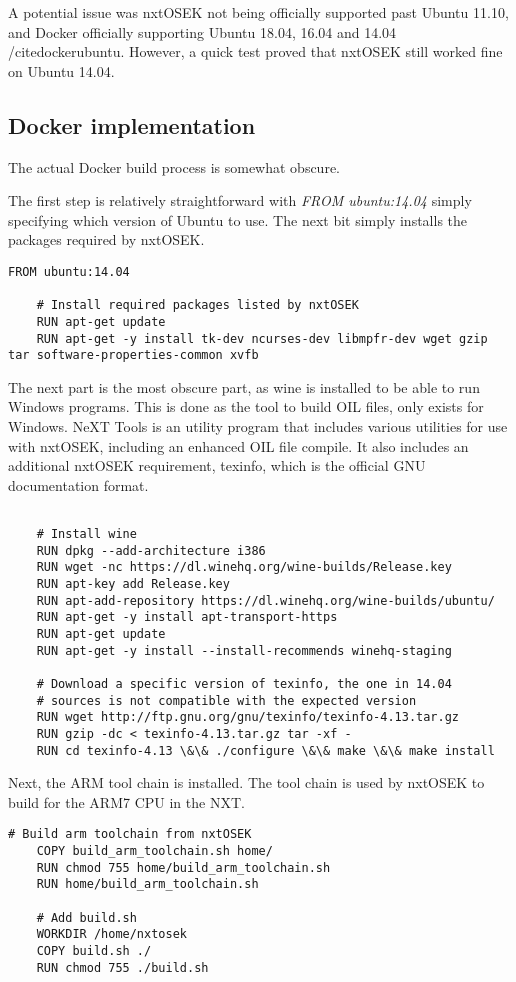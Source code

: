 A potential issue was nxtOSEK not being officially supported past Ubuntu 11.10, and Docker officially supporting Ubuntu 18.04, 16.04 and 14.04 /cite{dockerubuntu}.
However, a quick test proved that nxtOSEK still worked fine on Ubuntu 14.04.

\subsection{Docker implementation}\label{subsec:dockerimplementation}
The actual Docker build process is somewhat obscure.

The first step is relatively straightforward with \textit{FROM ubuntu:14.04} simply specifying which version of Ubuntu to use.
The next bit simply installs the packages required by nxtOSEK.
\begin{lstlisting}[language=docker,label={lst:dockerimplementation1},caption={Version definition and installation of packages required by nxtOSEK}]
    FROM ubuntu:14.04

    # Install required packages listed by nxtOSEK
    RUN apt-get update
    RUN apt-get -y install tk-dev ncurses-dev libmpfr-dev wget gzip tar software-properties-common xvfb
\end{lstlisting} 

The next part is the most obscure part, as wine is installed to be able to run Windows programs.
This is done as the tool to build OIL files, only exists for Windows.
NeXT Tools is an utility program that includes various utilities for use with nxtOSEK, including an enhanced OIL file compile\cite{nxttool}.
It also includes an additional nxtOSEK requirement, texinfo, which is the official GNU documentation format\cite{texinfo}.

\begin{lstlisting}[language=docker,label={lst:dockerimplementation2},caption={Reee}]

    # Install wine
    RUN dpkg --add-architecture i386
    RUN wget -nc https://dl.winehq.org/wine-builds/Release.key
    RUN apt-key add Release.key
    RUN apt-add-repository https://dl.winehq.org/wine-builds/ubuntu/
    RUN apt-get -y install apt-transport-https
    RUN apt-get update
    RUN apt-get -y install --install-recommends winehq-staging
    
    # Download a specific version of texinfo, the one in 14.04 
    # sources is not compatible with the expected version
    RUN wget http://ftp.gnu.org/gnu/texinfo/texinfo-4.13.tar.gz
    RUN gzip -dc < texinfo-4.13.tar.gz tar -xf -
    RUN cd texinfo-4.13 \&\& ./configure \&\& make \&\& make install
\end{lstlisting} 
Next, the ARM tool chain is installed.
The tool chain is used by nxtOSEK to build for the ARM7 CPU in the NXT.
\begin{lstlisting}[language=docker,label={lst:dockerimplementation3},caption={Reee}]
    # Build arm toolchain from nxtOSEK
    COPY build_arm_toolchain.sh home/
    RUN chmod 755 home/build_arm_toolchain.sh
    RUN home/build_arm_toolchain.sh
    
    # Add build.sh
    WORKDIR /home/nxtosek
    COPY build.sh ./
    RUN chmod 755 ./build.sh
\end{lstlisting}

